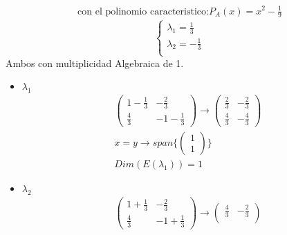 \begin{mdframed}
\begin{enumerate}
{\begin{gather*}
            \text{con el polinomio caracteristico:}
            P_A(x)= x^2 -\frac{1}{9}
        \end{gather*}
        \begin{equation}
                \begin{cases}
                   \lambda_1 = \frac{1}{3}\\
                   \lambda_2 = -\frac{1}{3}\\
                \end{cases}
        \end{equation}
        Ambos con multiplicidad Algebraica de 1.
            \begin{itemize}
                \item {
                $\lambda_1$
                \begin{gather*}
                    \begin{pmatrix}
                    1 -\frac{1}{3}& -\frac{2}{3}\\
                    \frac{4}{3} & -1-\frac{1}{3} 
                    \end{pmatrix}
                    \longrightarrow
                    \begin{pmatrix}
                    \frac{2}{3}& -\frac{2}{3}\\
                    \frac{4}{3} & -\frac{4}{3} 
                    \end{pmatrix}
                    \\
                    x=y \rightarrow span\{\begin{pmatrix}
                1 \\
                1 
                \end{pmatrix}\}\\
                Dim(E(\lambda_1)) = 1
                \end{gather*}
                }
                   \item {
                $\lambda_2$
                \begin{gather*}
                    \begin{pmatrix}
                    1 +\frac{1}{3}& -\frac{2}{3}\\
                    \frac{4}{3} & -1+\frac{1}{3} 
                    \end{pmatrix}
                    \longrightarrow
                    \begin{pmatrix}
                    \frac{4}{3}& -\frac{2}{3}\\

\end{pmatrix}
\end{gather*}}
\end{itemize}}
\end{enumerate}
\end{mdframed}
